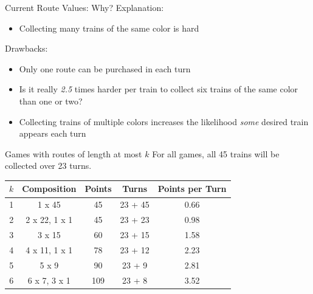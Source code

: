 \documentclass[12pt]{beamer}
\begin{document}
\begin{frame}{Current Route Values: Why?}
    Explanation: 
    \begin{itemize}
    \item Collecting many trains of the same 
    color is hard\footnotemark
    \end{itemize}
    \vspace{.5cm}
    \pause
    Drawbacks: 
    \begin{itemize}
    \item Only one route can be purchased in each turn
    \item Is it really \textit{2.5} times harder per train to 
    collect six trains of the same color than one or two?
    \item Collecting trains of multiple colors 
    increases the likelihood \textit{some} desired 
    train appears each turn
    \end{itemize}
\end{frame}

\begin{frame}{Games with routes of length at most $k$}
    For all games, all 45 trains will be collected over 23 turns.\footnotemark[2]
    
    \vspace{.5cm}
    \renewcommand{\arraystretch}{1.5}
    \begin{tabular}{| c | c | c | c | c |}
    \hline
    $k$ & Composition & Points & Turns & Points per Turn\\
    \hline
    1 & 1 x 45 & 45 & 23 + 45 & 0.66\\
    \hline
    2 & 2 x 22, 1 x 1 & 45 & 23 + 23 & 0.98\\
    \hline
    3 & 3 x 15 & 60 & 23 + 15 & 1.58\\
    \hline
    4 & 4 x 11, 1 x 1 & 78 & 23 + 12 & 2.23\\
    \hline
    5 & 5 x 9 & 90 & 23 + 9 & 2.81\\
    \hline
    6 & 6 x 7, 3 x 1 & 109 & 23 + 8 & 3.52\\
    \hline
    \end{tabular}
\end{frame}
\end{document}
